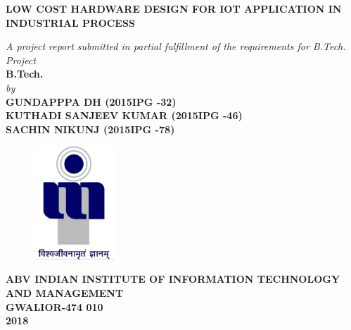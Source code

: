 \title{}
\author{}
\thispagestyle{empty}

\begin{titlepage}
\begin{center}
{\LARGE \bf LOW COST HARDWARE DESIGN FOR IOT APPLICATION IN INDUSTRIAL PROCESS} \\
\end{center}
\begin{center}
\vspace{0.6in}
{\large \it A project report submitted in partial fulfillment of the requirements for B.Tech. Project} \\
\vspace{0.6in}
{\large \bf B.Tech.} \\
\vspace{0.5in}
{\large \it by\\}
\vspace{0.3in}
{\large \bf GUNDAPPPA DH  (2015IPG -32)}\\
{\large \bf KUTHADI SANJEEV KUMAR (2015IPG -46)}\\
{\large \bf SACHIN NIKUNJ (2015IPG -78)}\\
\end {center}
\vspace{0.8in}
\begin{figure}[h]
\centerline{\includegraphics[width=1.2in]{iiitm}}
\end{figure}
\begin{center}
{\Large \bf ABV INDIAN INSTITUTE OF INFORMATION TECHNOLOGY AND MANAGEMENT\\
GWALIOR-474 010\\}
\vspace{0.2in}
{\Large \bf 2018\\}
\end{center}
\end{titlepage}
